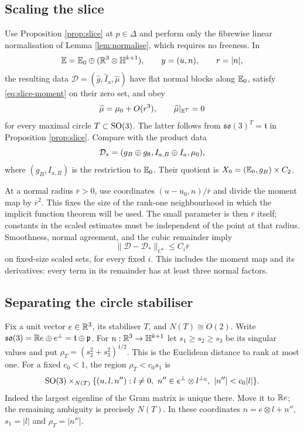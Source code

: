 \subsection{Scaling the slice}
Use Proposition \ref{prop:slice} at $p\in\Delta$ and perform
only the fibrewise linear normalisation of Lemma
\ref{lem:normalise}, which requires no freeness. In
\[
 \mathbb E=\mathbb E_0\oplus(\mathbb R^3\otimes\mathbb H^{k+1}),\qquad y=(u,n),
 \qquad r=|n|,
\]
the resulting data $\mathcal D=(\widehat g,\widehat I_a,
\widehat\mu)$ have flat normal blocks along $\mathbb E_0$, satisfy
\eqref{eq:slice-moment} on their zero set, and obey
\[
 \widehat\mu=\mu_0+O(r^3),\qquad
 \widehat\mu|_{\mathbb E^T}=0
\]
for every maximal circle $T\subset\operatorname{SO}(3)$. The latter follows
from $\mathfrak{so}(3)^T=\mathfrak t$ in Proposition
\ref{prop:slice}. Compare with the product data
\[
 \mathcal D_*=(g_B\oplus g_{\mathrm{fl}},
 I_{a,B}\oplus I_a,\mu_0),
\]
where $(g_B,I_{a,B})$ is the restriction to $\mathbb E_0$.
Their quotient is $X_0=(\mathbb E_0,g_B)\times C_2$.

At a normal radius $\bar r>0$, use coordinates
$(u-u_0,n)/\bar r$ and divide the moment map by $\bar r^2$.
This fixes the size of the rank-one neighbourhood in which the
implicit function theorem will be used. The small parameter is
then $\bar r$ itself; constants in the scaled estimates must be
independent of the point at that radius.
Smoothness, normal agreement, and the cubic remainder imply
\begin{equation}\label{eq:scaled-close}
 \|\mathcal D-\mathcal D_*\|_{C^i}\le C_i\bar r
\end{equation}
on fixed-size scaled sets, for every fixed $i$. This includes
the moment map and its derivatives: every term in its remainder
has at least three normal factors.

\subsection{Separating the circle stabiliser}
Fix a unit vector $e\in\mathbb R^3$, its stabiliser $T$, and
$N(T)\cong O(2)$. Write
$\mathfrak{so}(3)=\mathbb R e\oplus e^\perp=\mathfrak t\oplus\mathfrak p$.
For $n:\mathbb R^3\to\mathbb H^{k+1}$ let $s_1\ge s_2\ge s_3$
be its singular values and put $\rho_T=(s_2^2+s_3^2)^{1/2}$.
This is the Euclidean distance to rank at most one.
For a fixed $c_0<1$, the region $\rho_T<c_0s_1$ is
\begin{equation}\label{eq:svd-slice}
 \operatorname{SO}(3)\times_{N(T)}
 \{(u,l,n''):l\ne0,\ n''\in e^\perp\otimes l^{\perp_{\mathbb R}},
                         \ |n''|<c_0|l|\}.
\end{equation}
Indeed the largest eigenline of the Gram matrix is unique there.
Move it to $\mathbb R e$; the remaining ambiguity is precisely $N(T)$.
In these coordinates $n=e\otimes l+n''$, $s_1=|l|$ and
$\rho_T=|n''|$.

